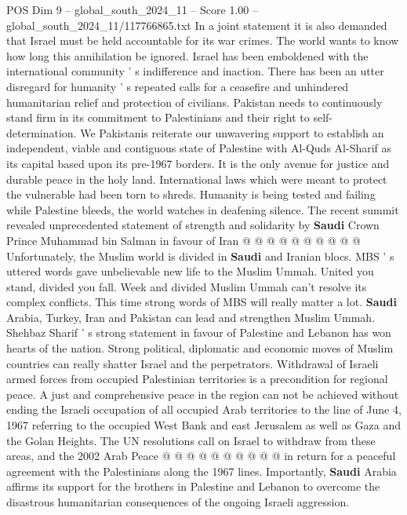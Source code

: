 \begin{textsample}{POS Dim 9 – global\_south\_2024\_11 – Score 1.00 – global\_south\_2024\_11/117766865.txt}
In a joint statement it is also demanded that Israel must be held accountable for its war crimes.
The world wants to know how long this annihilation be ignored.
Israel has been emboldened with the international community ' s indifference and inaction.
There has been an utter disregard for humanity ' s repeated calls for a ceasefire and unhindered humanitarian relief and protection of civilians.
Pakistan needs to continuously stand firm in its commitment to Palestinians and their right to self-determination.
We Pakistanis reiterate our unwavering support to establish an independent, viable and contiguous state of Palestine with Al-Quds Al-Sharif as its capital based upon its pre-1967 borders.
It is the only avenue for justice and durable peace in the holy land.
International laws which were meant to protect the vulnerable had been torn to shreds.
Humanity is being tested and failing while Palestine bleeds, the world watches in deafening silence.
The recent summit revealed unprecedented statement of strength and solidarity by \textbf{Saudi} Crown Prince Muhammad bin Salman in favour of Iran @ @ @ @ @ @ @ @ @ @ Unfortunately, the Muslim world is divided in \textbf{Saudi} and Iranian blocs.
MBS ' s uttered words gave unbelievable new life to the Muslim Ummah.
United you stand, divided you fall.
Week and divided Muslim Ummah can't resolve its complex conflicts.
This time strong words of MBS will really matter a lot. \textbf{Saudi} Arabia, Turkey, Iran and Pakistan can lead and strengthen Muslim Ummah.
Shehbaz Sharif ' s strong statement in favour of Palestine and Lebanon has won hearts of the nation.
Strong political, diplomatic and economic moves of Muslim countries can really shatter Israel and the perpetrators.
Withdrawal of Israeli armed forces from occupied Palestinian territories is a precondition for regional peace.
A just and comprehensive peace in the region can not be achieved without ending the Israeli occupation of all occupied Arab territories to the line of June 4, 1967 referring to the occupied West Bank and east Jerusalem as well as Gaza and the Golan Heights.
The UN resolutions call on Israel to withdraw from these areas, and the 2002 Arab Peace @ @ @ @ @ @ @ @ @ @ in return for a peaceful agreement with the Palestinians along the 1967 lines.
Importantly, \textbf{Saudi} Arabia affirms its support for the brothers in Palestine and Lebanon to overcome the disastrous humanitarian consequences of the ongoing Israeli aggression.

\end{textsample}
